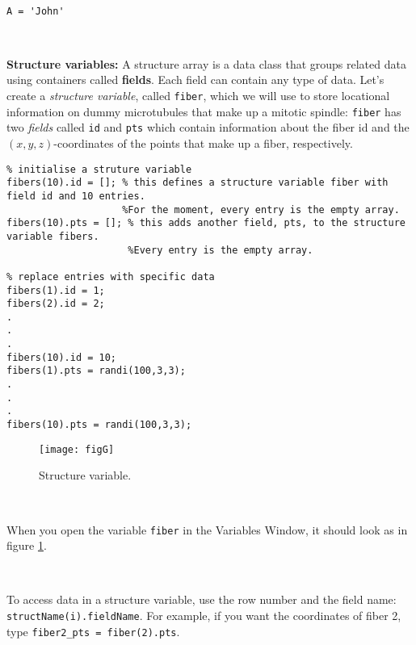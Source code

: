 \documentclass[11pt]{amsart}
\begin{document}
\

\color{blue}
\begin{verbatim}
A = 'John'
 \end{verbatim}
\color{black}

\
 
{\bf Structure variables:} A structure array is a data class that groups related data using containers called {\bf fields}. Each field can contain any type of data. Let's create a  {\it structure variable}, called \verb+fiber+, which we will use to store locational information on  dummy microtubules that make up a mitotic spindle:   \verb+fiber+ has two {\it fields} called  \verb+id+ and  \verb+pts+ which contain information about the fiber id and the $(x,y,z)$-coordinates of the points that make up a fiber, respectively. 

\color{blue}
\begin{verbatim}
% initialise a struture variable
fibers(10).id = []; % this defines a structure variable fiber with field id and 10 entries. 
                    %For the moment, every entry is the empty array.
fibers(10).pts = []; % this adds another field, pts, to the structure variable fibers. 
                     %Every entry is the empty array.
                     
% replace entries with specific data
fibers(1).id = 1;
fibers(2).id = 2;
.
.
.
fibers(10).id = 10;
fibers(1).pts = randi(100,3,3);
.
.
.
fibers(10).pts = randi(100,3,3);
\end{verbatim}
\color{black}

\begin{figure}[h]
\centering
\caption{Structure variable.}
\label{FigG}
	 \texttt{[image: figG]}
\end{figure}

\

When you open the variable \verb+fiber+ in the Variables Window, it should look as in figure \ref{FigG}.

\

To access data in a structure variable, use the row number and the field name: \verb+structName(i).fieldName+. For example, if you want the coordinates of fiber 2, type \verb+fiber2_pts = fiber(2).pts+.

\


\end{document}
